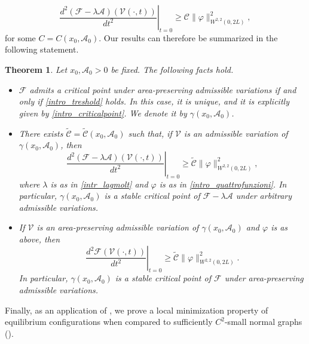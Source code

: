 \documentclass[11pt]{amsart}
\renewcommand{\geq}{\geqslant}
\newcommand{\A}{\mathcal A}
\newcommand{\F}{\mathcal F}
\newtheorem{theorem}{Theorem}[section]
\theoremstyle{definition}
\theoremstyle{remark}
\numberwithin{equation}{section}
\begin{document}
	\begin{equation*}
		\left.\frac{d^2(\F-\lambda \A)(\mathcal V(\cdot,t))}{dt^2}\right|_{t=0}\geq  {\mathcal C}\|\varphi\|^2_{W^{2,2}(0,2L)},
	\end{equation*}
	for some $ C= C(x_0,\A_0)$. Our
	results can therefore be summarized in the following statement.  
	\begin{theorem}\label{intro_mainthm}
		Let $x_0,\A_0>0$ be fixed. The following facts hold.
		\begin{itemize}
			\item [(i)] $\mathcal F$ admits a critical point under area-preserving admissible variations if and only if \eqref{intro_treshold} holds.
			In this case, it is unique, and it is explicitly given by \eqref{intro_criticalpoint}. We denote it by $\gamma(x_0,\A_0)$.
			\item [(ii)] There exists $\tilde {\mathcal C}=\tilde {\mathcal C}(x_0,\A_0)$ such that, if $\mathcal V$ is an admissible variation of $\gamma(x_0,\A_0)$, then
			\begin{equation*}
				\left.\frac{d^2(\F-\lambda \A)(\mathcal V(\cdot,t))}{dt^2}\right|_{t=0}\geq  \tilde {\mathcal C}\|\varphi\|^2_{W^{2,2}(0,2L)},
			\end{equation*}
			where $\lambda$ is as in \eqref{intr_lagmolt} and $\varphi$ is as in \eqref{intro_quattrofunzioni}. In particular,  $\gamma(x_0,\A_0)$ is a stable critical point of $\F-\lambda \A$ under arbitrary admissible variations.
			\item [(iii)] If $\mathcal V$ is an area-preserving admissible variation of $\gamma(x_0,\A_0)$ and $\varphi$ is as above, then 
			\begin{equation*}
				\left.\frac{d^2\F(\mathcal V(\cdot,t))}{dt^2}\right|_{t=0}\geq  \tilde {\mathcal C}\|\varphi\|^2_{W^{2,2}(0,2L)}.
			\end{equation*}
			In particular,  $\gamma(x_0,\A_0)$ is a stable critical point of $\F$ under area-preserving admissible variations.
		\end{itemize}
	\end{theorem}
	Finally, as an application of , we prove a local minimization property of equilibrium configurations when compared to sufficiently $C^2$-small normal graphs ().\\
	
\end{document}
